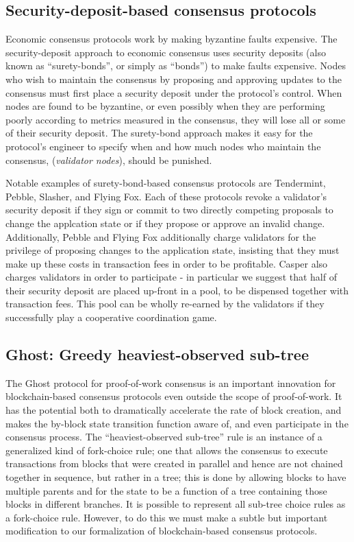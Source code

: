 \documentclass[11pt,a4paper]{article}
\begin{document}
\subsection{Security-deposit-based consensus protocols}

Economic consensus protocols work by making byzantine faults expensive. The security-deposit approach to economic consensus uses security deposits (also known as ``surety-bonds'', or simply as ``bonds'') to make faults expensive. Nodes who wish to maintain the consensus by proposing and approving updates to the consensus must first place a security deposit under the protocol's control. When nodes are found to be byzantine, or even possibly when they are performing poorly according to metrics measured in the consensus, they will lose all or some of their security deposit. The surety-bond approach makes it easy for the protocol's engineer to specify when and how much nodes who maintain the consensus, (\emph{validator nodes}), should be punished.

Notable examples of surety-bond-based consensus protocols are Tendermint\cite{TM}, Pebble\cite{Pebble}, Slasher\cite{Slasher}, and Flying Fox\cite{FlyingFox}. Each of these protocols revoke a validator's security deposit if they sign or commit to two directly competing proposals to change the applcation state or if they propose or approve an invalid change. Additionally, Pebble and Flying Fox additionally charge validators for the privilege of proposing changes to the application state, insisting that they must make up these costs in transaction fees in order to be profitable. Casper also charges validators in order to participate - in particular we suggest that half of their security deposit are placed up-front in a pool, to be dispensed together with transaction fees. This pool can be wholly re-earned by the validators if they successfully play a cooperative coordination game.

\subsection{Ghost: Greedy heaviest-observed sub-tree}

The Ghost protocol for proof-of-work consensus\cite{GHOST} is an important innovation for blockchain-based consensus protocols even outside the scope of proof-of-work. It has the potential both to dramatically accelerate the rate of block creation, and makes the by-block state transition function aware of, and even participate in the consensus process. The ``heaviest-observed sub-tree'' rule is an instance of a generalized kind of fork-choice rule; one that allows the consensus to execute transactions from blocks that were created in parallel and hence are not chained together in sequence, but rather in a tree; this is done by allowing blocks to have multiple parents and for the state to be a function of a tree containing those blocks in different branches. It is possible to represent all sub-tree choice rules as a fork-choice rule. However, to do this we must make a subtle but important modification to our formalization of blockchain-based consensus protocols.
\end{document}
